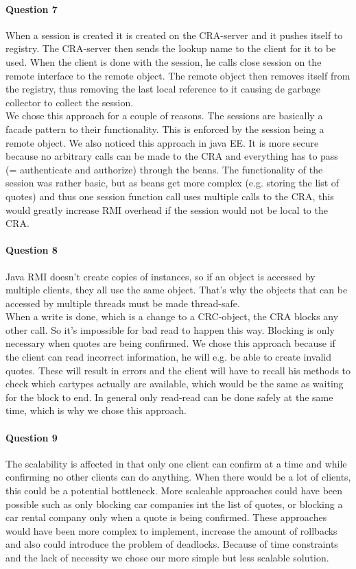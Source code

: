 \documentclass{ds-report}
\begin{document}
	\paragraph{Question 7} 
	When a session is created it is created on the CRA-server and it pushes itself to registry. The CRA-server then sends the lookup name to the client for it to be used. When the client is done with the session, he calls close session on the remote interface to the remote object. The remote object then removes itself from the registry, thus removing the last local reference to it causing de garbage collector to collect the session. \\
	
	We chose this approach for a couple of reasons.
	The sessions are basically a facade pattern to their functionality. This is enforced by the session being a remote object.
	We also noticed this approach in java EE.
	It is more secure because no arbitrary calls can be made to the CRA and everything has to pass (= authenticate and authorize) through the beans.
	The functionality of the session was rather basic, but as beans get more complex (e.g. storing the list of quotes) and thus one session function call uses multiple calls to the CRA, this would greatly increase RMI overhead if the session would not be local to the CRA.
	
	\paragraph{Question 8} 
	Java RMI doesn't create copies of instances, so if an object is accessed by multiple clients, they all use the same object. That's why the objects that can be accessed by multiple threads must be made thread-safe.\\
	
	
	When a write is done, which is a change to a CRC-object, the CRA blocks any other call. So it's impossible for bad read to happen this way. Blocking is only necessary when quotes are being confirmed. We chose this approach because if the client can read incorrect information, he will e.g. be able to create invalid quotes. These will result in errors and the client will have to recall his methods to check which cartypes actually are available, which would be the same as waiting for the block to end.
	In general only read-read can be done safely at the same time, which is why we chose this approach.
	 
	
	\paragraph{Question 9} 
	The scalability is affected in that only one client can confirm at a time and while confirming no other clients can do anything. When there would be a lot of clients, this could be a potential bottleneck. 
	More scaleable approaches could have been possible such as only blocking car companies int the list of quotes, or blocking a car rental company only when a quote is being confirmed.
	These approaches would have been more complex to implement, increase the amount of rollbacks and also could introduce the problem of deadlocks.
	Because of time constraints and the lack of necessity we chose our more simple but less scalable solution.
	
\end{document}
